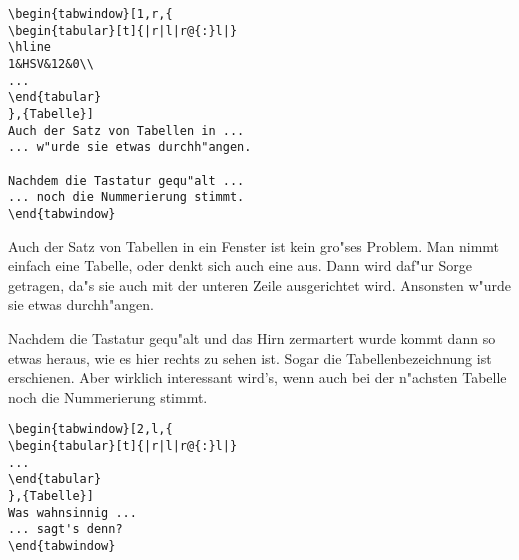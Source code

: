 \begin{verbatim}
\begin{tabwindow}[1,r,{
\begin{tabular}[t]{|r|l|r@{:}l|}
\hline
1&HSV&12&0\\
...
\end{tabular}
},{Tabelle}]
Auch der Satz von Tabellen in ...
... w"urde sie etwas durchh"angen.

Nachdem die Tastatur gequ"alt ...
... noch die Nummerierung stimmt.
\end{tabwindow}
\end{verbatim}

Auch der Satz von Tabellen in ein Fenster ist kein gro"ses Problem.
Man nimmt einfach eine Tabelle, oder denkt sich auch eine aus.
Dann wird daf"ur Sorge getragen, da"s sie auch mit der unteren
Zeile ausgerichtet wird. Ansonsten w"urde sie etwas durchh"angen.

Nachdem die Tastatur gequ"alt und das Hirn zermartert wurde kommt
dann so etwas heraus, wie es hier rechts zu sehen ist. Sogar die
Tabellenbezeichnung ist erschienen. Aber wirklich interessant wird's,
wenn auch bei der n"achsten Tabelle noch die Nummerierung stimmt.
\end{tabwindow}

\begin{verbatim}
\begin{tabwindow}[2,l,{
\begin{tabular}[t]{|r|l|r@{:}l|}
...
\end{tabular}
},{Tabelle}]
Was wahnsinnig ...
... sagt's denn?
\end{tabwindow}
\end{verbatim}

